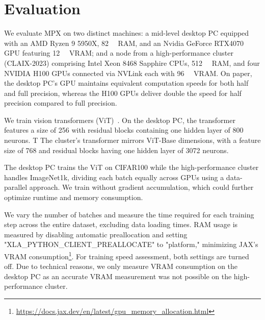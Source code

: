 \documentclass[copyright, logo]{dsme}
\newcommand{\mpx}{\textsc{MPX}}
\begin{document}
\section{Evaluation}
We evaluate \mpx{} on two distinct machines: a mid-level desktop PC equipped with an AMD Ryzen 9 5950X, \qty{82}{\giga\byte} RAM, and an Nvidia GeForce RTX4070 GPU featuring \qty{12}{\giga\byte} VRAM; and a node from a high-performance cluster (CLAIX-2023) comprising Intel Xeon 8468 Sapphire CPUs, \qty{512}{\giga\byte} RAM, and four NVIDIA H100 GPUs connected via NVLink each with \qty{96}{\giga\byte} VRAM. 
On paper, the desktop PC's GPU maintains equivalent computation speeds for both half and full precision, whereas the H100 GPUs deliver double the speed for half precision compared to full precision.

We train vision transformers (ViT)~\citep{dosovitskiy2020image,steiner2021train}. On the desktop PC, the transformer features a size of 256 with residual blocks containing one hidden layer of 800 neurons. T
The cluster's transformer mirrors ViT-Base dimensions, with a feature size of 768 and residual blocks having one hidden layer of 3072 neurons.

The desktop PC trains the ViT on CIFAR100 while the high-performance cluster handles ImageNet1k, dividing each batch equally across GPUs using a data-parallel approach. We train without gradient accumulation, which could further optimize runtime and memory consumption.

We vary the number of batches and measure the time required for each training step across the entire dataset, excluding data loading times. 
RAM usage is measured by disabling automatic preallocation and setting "XLA\_PYTHON\_CLIENT\_PREALLOCATE" to "platform," minimizing JAX's VRAM consumption\footnote{\url{https://docs.jax.dev/en/latest/gpu_memory_allocation.html}}. 
For training speed assessment, both settings are turned off.
Due to technical reasons, we only measure VRAM consumption on the desktop PC as an accurate VRAM measurement was not possible on the high-performance cluster. 
\end{document}

